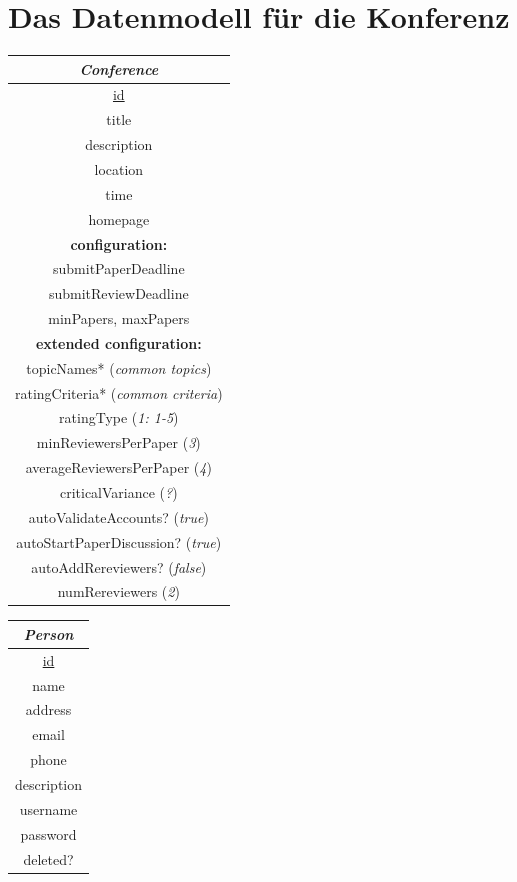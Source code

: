 \documentclass[a4paper, 12pt]{scrartcl}
\begin{document}
\pagestyle{headings}  \setcounter{page}{1}

    \section{Das Datenmodell f\"{u}r die Konferenz}

    \begin{tabular}{|c|}
      \hline
      \emph{Conference} \\
      \hline
      \underline{id} \\
      title \\
      description \\
      location \\
      time \\
      homepage \\
      \textbf{configuration:} \\
      submitPaperDeadline \\
      submitReviewDeadline \\
      minPapers, maxPapers \\
      \textbf{extended configuration:} \\
      topicNames* (\textit{common topics}) \\
      ratingCriteria* (\textit{common criteria}) \\
      ratingType (\textit{1: 1-5}) \\
      minReviewersPerPaper (\textit{3}) \\
      averageReviewersPerPaper (\textit{4}) \\
      criticalVariance (\textit{?}) \\
      autoValidateAccounts? (\textit{true}) \\
      autoStartPaperDiscussion? (\textit{true}) \\
      autoAddRereviewers? (\textit{false}) \\
      numRereviewers (\textit{2}) \\
      \hline
    \end{tabular}
    \begin{tabular}{|c|}
      \hline
      \emph{Person} \\
      \hline
      \underline{id} \\
      name \\
      address \\
      email \\
      phone \\
      description \\
      username \\
      password \\
      deleted? \\
      \hline
    \end{tabular}
\end{document}
